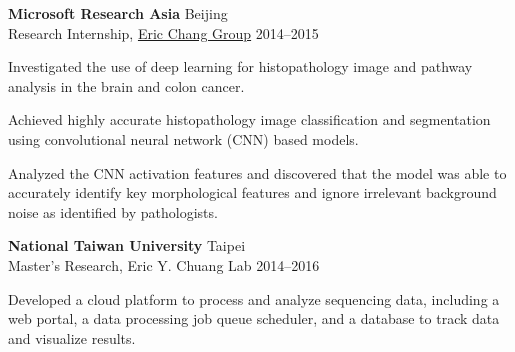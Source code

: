 \begin{entrylist}
\item \textbf{Microsoft Research Asia} \hfill Beijing\\
Research Internship, \href{https://www.microsoft.com/en-us/research/people/echang/}{Eric Chang Group} \hfill
2014--2015
\begin{detaillist}
    \item Investigated the use of deep learning for histopathology image and pathway analysis in the brain and colon cancer.
    \item Achieved highly accurate histopathology image classification and segmentation using convolutional neural network (CNN) based models.
    \item Analyzed the CNN activation features and discovered that the model was able to
    accurately identify key morphological features and ignore irrelevant background noise as identified by pathologists.
\end{detaillist}

\item \textbf{National Taiwan University} \hfill Taipei\\
Master's Research, Eric Y. Chuang Lab \hfill
2014--2016
\begin{detaillist}
    \item Developed a cloud platform to process and analyze sequencing data, including a web portal, a data processing job queue scheduler, and a database to track data and visualize results.
\end{detaillist}


\end{entrylist}
